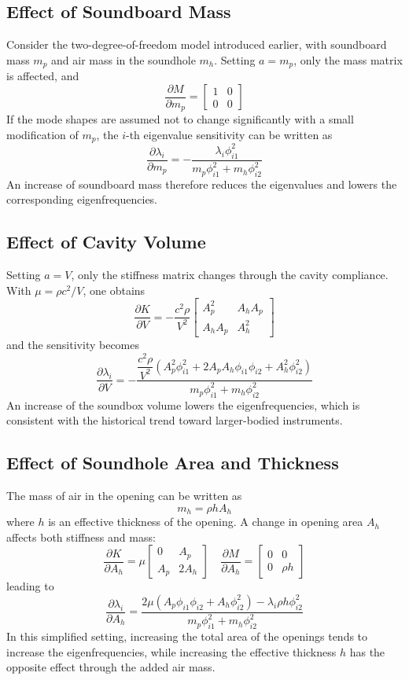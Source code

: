 \subsection{Effect of Soundboard Mass}

Consider the two-degree-of-freedom model introduced earlier, with soundboard mass \( m_p \) and air mass in the soundhole \( m_h \). Setting \( a=m_p \), only the mass matrix is affected, and
\[
\frac{\partial M}{\partial m_p}
=
\begin{bmatrix}
1 & 0 \\
0 & 0
\end{bmatrix}
\]
If the mode shapes are assumed not to change significantly with a small modification of \( m_p \), the \( i \)-th eigenvalue sensitivity can be written as
\[
\frac{\partial \lambda_i}{\partial m_p}
=
-\frac{\lambda_i \phi_{i1}^{2}}{m_p\phi_{i1}^{2}+m_h\phi_{i2}^{2}}
\]
An increase of soundboard mass therefore reduces the eigenvalues and lowers the corresponding eigenfrequencies.

\subsection{Effect of Cavity Volume}

Setting \( a=V \), only the stiffness matrix changes through the cavity compliance. With \( \mu=\rho c^{2}/V \), one obtains
\[
\frac{\partial K}{\partial V}
=
-\frac{c^{2}\rho}{V^{2}}
\begin{bmatrix}
A_p^{2} & A_hA_p \\
A_hA_p  & A_h^{2}
\end{bmatrix}
\]
and the sensitivity becomes
\[
\frac{\partial \lambda_i}{\partial V}
=
-\frac{\dfrac{c^{2}\rho}{V^{2}}\left(A_p^{2}\phi_{i1}^{2}+2A_pA_h\phi_{i1}\phi_{i2}+A_h^{2}\phi_{i2}^{2}\right)}{m_p\phi_{i1}^{2}+m_h\phi_{i2}^{2}}
\]
An increase of the soundbox volume lowers the eigenfrequencies, which is consistent with the historical trend toward larger-bodied instruments.

\subsection{Effect of Soundhole Area and Thickness}

The mass of air in the opening can be written as
\[
m_h = \rho h A_h
\]
where \( h \) is an effective thickness of the opening. A change in opening area \( A_h \) affects both stiffness and mass:
\[
\frac{\partial K}{\partial A_h}
=
\mu
\begin{bmatrix}
0   & A_p \\
A_p & 2A_h
\end{bmatrix}
\quad
\frac{\partial M}{\partial A_h}
=
\begin{bmatrix}
0 & 0 \\
0 & \rho h
\end{bmatrix}
\]
leading to
\[
\frac{\partial \lambda_i}{\partial A_h}
=
\frac{2\mu\left(A_p\phi_{i1}\phi_{i2}+A_h\phi_{i2}^{2}\right)-\lambda_i\rho h\phi_{i2}^{2}}{m_p\phi_{i1}^{2}+m_h\phi_{i2}^{2}}
\]
In this simplified setting, increasing the total area of the openings tends to increase the eigenfrequencies, while increasing the effective thickness \( h \) has the opposite effect through the added air mass.

